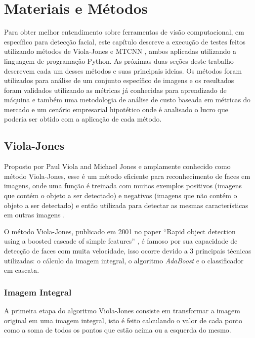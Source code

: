 \chapter{Materiais e Métodos}\label{cap:ferramentas}

Para obter melhor entendimento sobre ferramentas de visão computacional, em específico para detecção facial, este capítulo descreve a execução de testes feitos utilizando métodos de Viola-Jones \cite{paper-viola-jones} e MTCNN \cite{mtcnn}, ambos aplicadas utilizando a linguagem de programação Python. As próximas duas seções deste trabalho descrevem cada um desses métodos e suas principais ideias.
Os métodos foram utilizados para análise de um conjunto específico de imagens e os resultados foram validados utilizando as métricas já conhecidas para aprendizado de máquina e também uma metodologia de análise de custo baseada em métricas do mercado e um cenário empresarial hipotético onde é analisado o lucro que poderia ser obtido com a aplicação de cada método.

\section{Viola-Jones}

Proposto por Paul Viola and Michael Jones e amplamente conhecido como método Viola-Jones, esse é um método eficiente para reconhecimento de faces em imagens, onde uma função é treinada com muitos exemplos positivos (imagens que contém o objeto a ser detectado) e negativos (imagens que não contém o objeto a ser detectado) e então utilizada para detectar as mesmas características em outras imagens \cite{itseez2014theopencv}.

O método Viola-Jones, publicado em 2001 no paper ``Rapid object detection using a boosted cascade of simple features'' \cite{paper-viola-jones}, é famoso por sua capacidade de detecção de faces com muita velocidade, isso ocorre devido a 3 principais técnicas utilizadas: o cálculo da imagem integral, o algoritmo \textit{AdaBoost} e o classificador em cascata.

\subsection{Imagem Integral}

A primeira etapa do algoritmo Viola-Jones consiste em transformar a imagem original em uma imagem integral, isto é feito calculando o valor de cada ponto como a soma de todos os pontos que estão acima ou a esquerda do mesmo.

